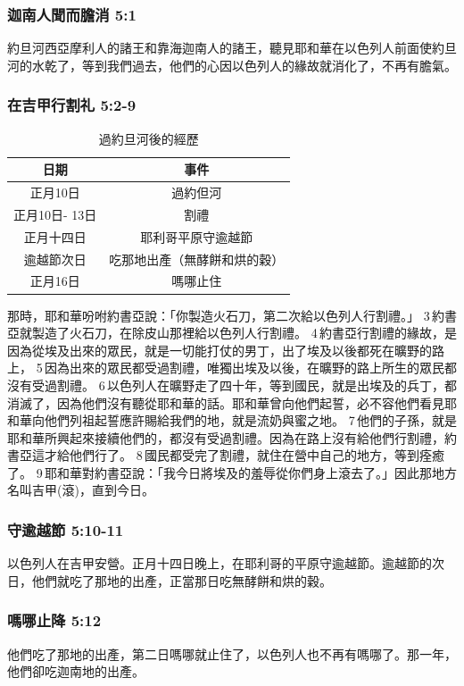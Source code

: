 \subsubsection{迦南人聞而膽消 5:1}
約旦河西亞摩利人的諸王和靠海迦南人的諸王，聽見耶和華在以色列人前面使約旦河的水乾了，等到我們過去，他們的心因以色列人的緣故就消化了，不再有膽氣。

\subsubsection{在吉甲行割礼 5:2-9}
\begin{table}
\centering
\begin{tabular}{|c|c|}
\hline
\hline
日期                   & 事件   \\\hline
正月10日               & 過約但河    \\\hline
正月10日- 13日 & 割禮\\\hline
正月十四日             & 耶利哥平原守逾越節   \\\hline
逾越節次日           & 吃那地出產（無酵餅和烘的穀）\\\hline
正月16日             & 嗎哪止住　\\\hline
\end{tabular}
\caption{過約旦河後的經歷}
\end{table}
那時，耶和華吩咐約書亞說：「你製造火石刀，第二次給以色列人行割禮。」 3 約書亞就製造了火石刀，在除皮山那裡給以色列人行割禮。 4 約書亞行割禮的緣故，是因為從埃及出來的眾民，就是一切能打仗的男丁，出了埃及以後都死在曠野的路上， 5 因為出來的眾民都受過割禮，唯獨出埃及以後，在曠野的路上所生的眾民都沒有受過割禮。 6 以色列人在曠野走了四十年，等到國民，就是出埃及的兵丁，都消滅了，因為他們沒有聽從耶和華的話。耶和華曾向他們起誓，必不容他們看見耶和華向他們列祖起誓應許賜給我們的地，就是流奶與蜜之地。 7 他們的子孫，就是耶和華所興起來接續他們的，都沒有受過割禮。因為在路上沒有給他們行割禮，約書亞這才給他們行了。 8 國民都受完了割禮，就住在營中自己的地方，等到痊癒了。 9 耶和華對約書亞說：「我今日將埃及的羞辱從你們身上滾去了。」因此那地方名叫吉甲(滾)，直到今日。

\subsubsection{守逾越節 5:10-11}
以色列人在吉甲安營。正月十四日晚上，在耶利哥的平原守逾越節。逾越節的次日，他們就吃了那地的出產，正當那日吃無酵餅和烘的穀。

\subsubsection{嗎哪止降 5:12}
他們吃了那地的出產，第二日嗎哪就止住了，以色列人也不再有嗎哪了。那一年，他們卻吃迦南地的出產。

